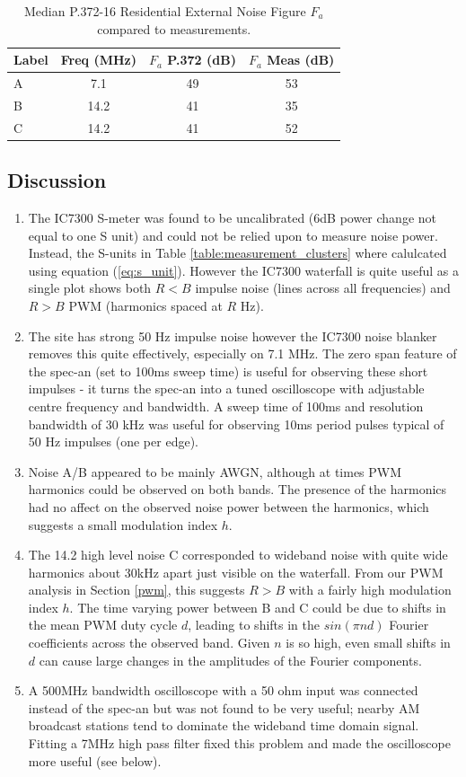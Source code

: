 \documentclass{article}
\begin{document}
\begin{table}[h]
\centering
\begin{tabular}{l c c c}
 \hline
 Label & Freq (MHz) & $F_a$ P.372 (dB) & $F_a$ Meas (dB) \\
 \hline
 A & 7.1  & 49 & 53 \\
 B & 14.2 & 41 & 35 \\
 C & 14.2 & 41 & 52 \\
\end{tabular}
\caption{Median P.372-16 Residential External Noise Figure $F_a$ compared to measurements.}
\label{table:external_noise_figure}
\end{table}

\subsection{Discussion}

\begin{enumerate}
\item The IC7300 S-meter was found to be uncalibrated \cite{vu2nsb_s_meter} (6dB power change not equal to one S unit) and could not be relied upon to measure noise power.  Instead, the S-units in Table \ref{table:measurement_clusters} where calulcated using equation (\ref{eq:s_unit}). However the IC7300 waterfall is quite useful as a single plot shows both $R<B$ impulse noise (lines across all frequencies) and $R>B$ PWM (harmonics spaced at $R$ Hz).
\item The site has strong 50 Hz impulse noise however the IC7300 noise blanker removes this quite effectively, especially on 7.1 MHz.  The zero span feature of the spec-an (set to 100ms sweep time) is useful for observing these short impulses - it turns the spec-an into a tuned oscilloscope with adjustable centre frequency and bandwidth.  A sweep time of 100ms and resolution bandwidth of 30 kHz was useful for observing 10ms period pulses typical of 50 Hz impulses (one per edge).
\item Noise A/B appeared to be mainly AWGN, although at times PWM harmonics could be observed on both bands. The presence of the harmonics had no affect on the observed noise power between the harmonics, which suggests a small modulation index $h$.
\item The 14.2 high level noise C corresponded to wideband noise with quite wide harmonics about 30kHz apart just visible on the waterfall.  From our PWM analysis in Section \ref{pwm}, this suggests $R>B$ with a fairly high modulation index $h$.  The time varying power between B and C could be due to shifts in the mean PWM duty cycle $d$, leading to shifts in the $sin(\pi n d)$ Fourier coefficients across the observed band.  Given $n$ is so high, even small shifts in $d$ can cause large changes in the amplitudes of the Fourier components.
\item A 500MHz bandwidth oscilloscope with a 50 ohm input was connected instead of the spec-an but was not found to be very useful; nearby AM broadcast stations tend to dominate the wideband time domain signal.  Fitting a 7MHz high pass filter fixed this problem and made the oscilloscope more useful (see below). 
\end{enumerate}
\end{document}
